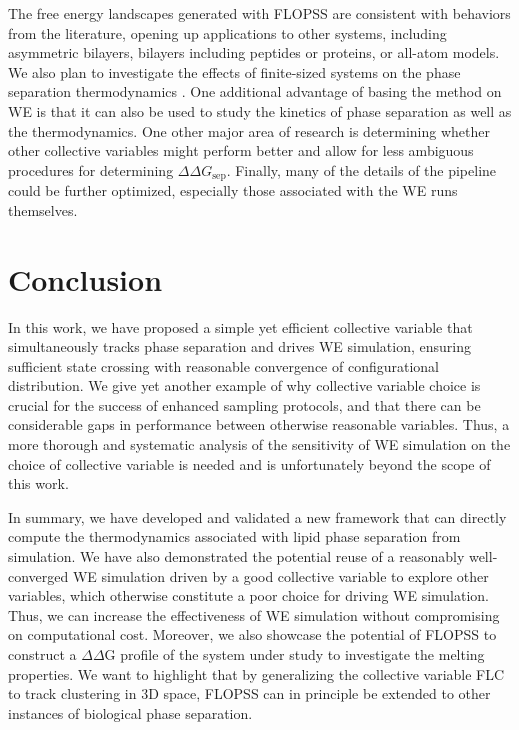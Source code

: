 \documentclass{biophys-new}
\begin{document}
The free energy landscapes generated with FLOPSS are consistent with behaviors from the literature, opening up applications to other systems, including asymmetric bilayers, bilayers including peptides or proteins, or all-atom models. We also plan to investigate the effects of finite-sized systems on the phase separation thermodynamics \cite{Pantelopulos2017}. One additional advantage of basing the method on WE is that it can also be used to study the kinetics of phase separation as well as the thermodynamics. One other major area of research is determining whether other collective variables might perform better and allow for less ambiguous procedures for determining $\Delta\Delta G_\text{sep}$. Finally, many of the details of the pipeline could be further optimized, especially those associated with the WE runs themselves.

\section*{Conclusion}

In this work, we have proposed a simple yet efficient collective variable that
simultaneously tracks phase separation and drives WE simulation, ensuring
sufficient state crossing with reasonable convergence of configurational
distribution. We give yet another example of why collective variable choice is
crucial for the success of enhanced sampling protocols, and that there can be
considerable gaps in performance between otherwise reasonable variables. Thus,
a more thorough and systematic analysis of the sensitivity of WE simulation on
the choice of collective variable is needed and is unfortunately beyond the
scope of this work.

In summary, we have developed and validated a new framework that can directly compute the thermodynamics associated with lipid phase separation from simulation.
We have also demonstrated the potential reuse of a reasonably well-converged WE simulation driven by a good collective variable to explore other variables, which otherwise constitute a poor choice for driving WE simulation.
Thus, we can increase the effectiveness of WE simulation without compromising on computational cost.
Moreover, we also showcase the potential of FLOPSS to construct a $\Delta\Delta$G profile of the system under study to investigate the melting properties.
We want to highlight that by generalizing the collective variable FLC to track clustering in 3D space, FLOPSS can in principle be extended to other instances of biological phase separation.
\end{document}
